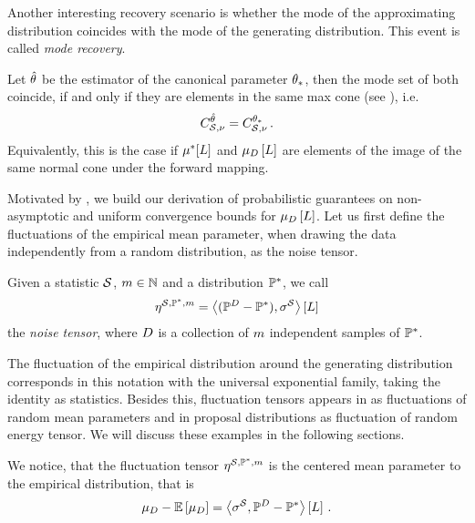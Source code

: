 
Another interesting recovery scenario is whether the mode of the approximating distribution coincides with the mode of the generating distribution.
This event is called \emph{mode recovery}.

Let $\hat{\theta}$ be the estimator of the canonical parameter $\theta_{*}$, then the mode set of both coincide, if and only if they are elements in the same max cone (see ), i.e.
\begin{align*}
    C_{\mathcal{S},\nu}^{\hat{\theta}} = C_{\mathcal{S},\nu}^{\theta_{*}} \, .
\end{align*}
Equivalently, this is the case if $\mu^*[L]$ and $\mu_{D}\left[L\right]$ are elements of the image of the same normal cone under the forward mapping.



Motivated by , we build our derivation of probabilistic guarantees on non-asymptotic and uniform convergence bounds for $\mu_{D}\left[L\right]$.
Let us first define the fluctuations of the empirical mean parameter, when drawing the data independently from a random distribution, as the noise tensor.

\begin{definition}
    \label{def:noiseTensor}
    Given a statistic $\mathcal{S}$, $m\in\mathbb{N}$ and a distribution $\mathbb{P}^*$, we call
    \begin{align*}
        \eta^{\mathcal{S},\mathbb{P}^*,m} = \left\langle (\mathbb{P}^{D}-\mathbb{P}^*),\sigma^{\mathcal{S}}\right\rangle \left[ L \right]
    \end{align*}
    the \emph{noise tensor}, where $D$ is a collection of $m$ independent samples of $\mathbb{P}^*$.
\end{definition}

The fluctuation of the empirical distribution around the generating distribution corresponds in this notation with the universal exponential family, taking the identity as statistics.
Besides this, fluctuation tensors appears in \MarkovLogicNetworks{} as fluctuations of random mean parameters and in proposal distributions as fluctuation of random energy tensor.
We will discuss these examples in the following sections.


We notice, that the fluctuation tensor $\eta^{\mathcal{S},\mathbb{P}^*,m}$ is the centered mean parameter to the empirical distribution, that is
\begin{align*}
    \mu_{D} - \mathbb{E}\left[\mu_{D}\right] =  \left\langle \sigma^{\mathcal{S}},\mathbb{P}^{D}-\mathbb{P}^*\right\rangle \left[ L \right] \, .
\end{align*}

